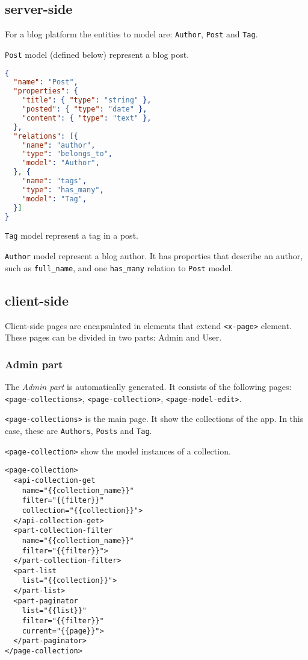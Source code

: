 \documentclass{sig-alternate}
\begin{document}
\subsection{server-side}
For a blog platform the entities to model are: \texttt{Author}, \texttt{Post} and \texttt{Tag}.

\texttt{Post} model (defined below) represent a blog post.

\begin{lstlisting}[language=json]
{
  "name": "Post",
  "properties": {
    "title": { "type": "string" },
    "posted": { "type": "date" },
    "content": { "type": "text" },
  }, 
  "relations": [{ 
    "name": "author", 
    "type": "belongs_to",
    "model": "Author",
  }, {
    "name": "tags", 
    "type": "has_many",
    "model": "Tag",
  }]
}
\end{lstlisting}

\texttt{Tag} model represent a tag in a post.

\texttt{Author} model represent a blog author. It has properties that describe an author, such as \texttt{full\_name}, and one \texttt{has\_many} relation to \texttt{Post} model.

  
\subsection{client-side}
Client-side pages are encapsulated in elements that extend \texttt{<x-page>} element. These pages can be divided in two parts: Admin and User.

\subsubsection{Admin part}
The \emph{Admin part} is automatically generated. 
It consists of the following pages: \texttt{<page-collections>}, \texttt{<page-collection>}, \texttt{<page-model-edit>}.

\vspace{0.2cm}

\texttt{<page-collections>} is the main page. It show the collections of the app. In this case, these are \texttt{Authors}, \texttt{Posts} and \texttt{Tag}.

\vspace{0.2cm}

\texttt{<page-collection>} show the model instances of a collection.

\begin{lstlisting}[language=HTML5]
<page-collection>
  <api-collection-get 
    name="{{collection_name}}" 
    filter="{{filter}}"
    collection="{{collection}}">
  </api-collection-get>
  <part-collection-filter 
    name="{{collection_name}}"  
    filter="{{filter}}">
  </part-collection-filter>
  <part-list 
    list="{{collection}}">
  </part-list>
  <part-paginator 
    list="{{list}}" 
    filter="{{filter}}"
    current="{{page}}">
  </part-paginator>
</page-collection>
\end{lstlisting}
\end{document}
